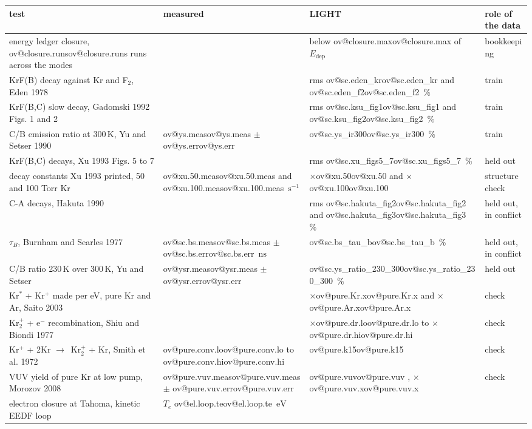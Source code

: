 \documentclass[11pt]{article}
\makeatletter
\newcommand\ov[1]{\ifcsname ov@#1\endcsname\csname ov@#1\endcsname
  \else\errmessage{no overview number '#1'. Rerun make_overview.py}\fi}
\newcommand{\unit}[1]{\ensuremath{\,\mathrm{#1}}}
\newcommand{\el}{\ensuremath{\mathrm{e}^-}}
\newcommand{\Krs}{Kr\ensuremath{^*}}
\newcommand{\Krp}{Kr\ensuremath{^+}}
\newcommand{\Krtp}{Kr\ensuremath{_2^+}}
\newcommand{\ra}{\ensuremath{\to}\ }
\newcommand{\Edep}{\ensuremath{E_\mathrm{dep}}}
\newcommand{\x}[1]{\ensuremath{\times}#1}
\makeatother
\begin{document}
\begin{table}[h]
\centering\footnotesize
\renewcommand{\arraystretch}{1.12}
\begin{tabularx}{\linewidth}{@{}>{\raggedright\arraybackslash}X
  >{\raggedright\arraybackslash}p{2.6cm}>{\raggedright\arraybackslash}p{2.5cm}
  >{\raggedright\arraybackslash}p{2.2cm}@{}}
\toprule
test & measured & LIGHT & role of the data\\
\midrule
energy ledger closure, \ov{closure.runs} runs across the modes & & below
  \ov{closure.max} of \Edep & bookkeeping\\
KrF(B) decay against Kr and F$_2$, Eden 1978 & & rms \ov{sc.eden_kr} and
  \ov{sc.eden_f2}\,\% & train\\
KrF(B,C) slow decay, Gadomski 1992 Figs. 1 and 2 & & rms \ov{sc.ksu_fig1}
  and \ov{sc.ksu_fig2}\,\% & train\\
C/B emission ratio at 300\unit{K}, Yu and Setser 1990 & \ov{ys.meas}
  $\pm$ \ov{ys.err} & \ov{sc.ys_ir300}\,\% & train\\
KrF(B,C) decays, Xu 1993 Figs. 5 to 7 & & rms \ov{sc.xu_figs5_7}\,\% &
  held out\\
decay constants Xu 1993 printed, 50 and 100 Torr Kr & \ov{xu.50.meas}
  and \ov{xu.100.meas}\unit{s^{-1}} & \x{\ov{xu.50}} and \x{\ov{xu.100}} &
  structure check\\
C-A decays, Hakuta 1990 & & rms \ov{sc.hakuta_fig2} and
  \ov{sc.hakuta_fig3}\,\% & held out, in conflict\\
$\tau_B$, Burnham and Searles 1977 & \ov{sc.bs.meas} $\pm$
  \ov{sc.bs.err}\unit{ns} & \ov{sc.bs_tau_b}\,\% & held out, in conflict\\
C/B ratio 230\unit{K} over 300\unit{K}, Yu and Setser & \ov{ysr.meas}
  $\pm$ \ov{ysr.err} & \ov{sc.ys_ratio_230_300}\,\% & held out\\
\midrule
\Krs{} + \Krp{} made per eV, pure Kr and Ar, Saito 2003 & & \x{\ov{pure.Kr.x}}
  and \x{\ov{pure.Ar.x}} & check\\
\Krtp{} + \el{} recombination, Shiu and Biondi 1977 & & \x{\ov{pure.dr.lo}}
  to \x{\ov{pure.dr.hi}} & check\\
\Krp{} + 2Kr \ra \Krtp{} + Kr, Smith et al. 1972 & \ov{pure.conv.lo} to
  \ov{pure.conv.hi} & \ov{pure.k15} & check\\
VUV yield of pure Kr at low pump, Morozov 2008 & \ov{pure.vuv.meas}
  $\pm$ \ov{pure.vuv.err} & \ov{pure.vuv}, \x{\ov{pure.vuv.x}} & check\\
electron closure at Tahoma, kinetic EEDF loop & $T_e$ \ov{el.loop.te}\unit{eV}

\end{tabularx}
\end{table}
\end{document}
